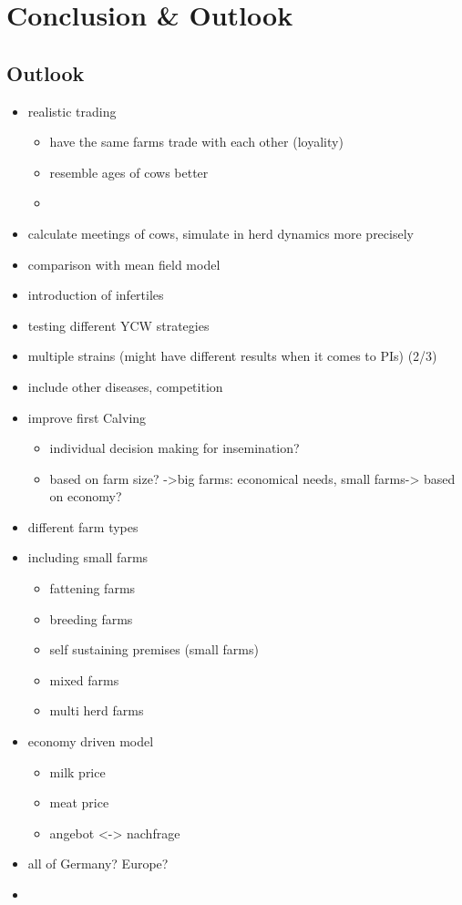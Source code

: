 \chapter{Conclusion \& Outlook}
\section{Outlook}
\begin{itemize}
\item realistic trading
\begin{itemize}
\item have the same farms trade with each other (loyality)
\item resemble ages of cows better
\item \citep{hoscheit2016dynamical}
\end{itemize}
\item calculate meetings of cows, simulate in herd dynamics more precisely
\item comparison with mean field model
\item introduction of infertiles
\item testing different YCW strategies
\item multiple strains (might have different results when it comes to PIs) (2/3)
\item include other diseases, competition
\item improve first Calving 
\begin{itemize}
\item individual decision making for insemination? 
\item based on farm size? ->big farms: economical needs, small farms-> based on economy?
\end{itemize}
\item different farm types
\item including small farms
\begin{itemize}
\item fattening farms
\item breeding farms
\item self sustaining premises (small farms)
\item mixed farms
\item multi herd farms
\end{itemize}

\item economy driven model
\begin{itemize}
\item milk price
\item meat price
\item angebot <-> nachfrage
\end{itemize}
\item all of Germany? Europe?
\item 
\end{itemize}


